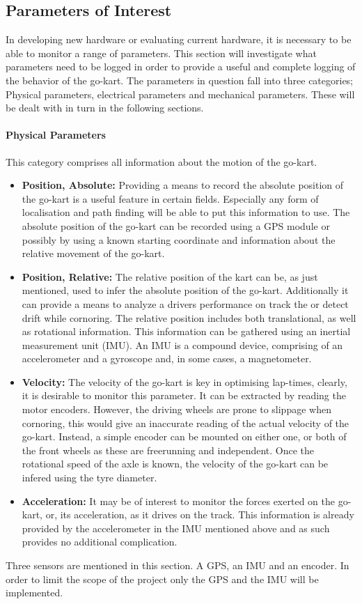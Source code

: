 
\subsection{Parameters of Interest}
\label{sec:parameters}
In developing new hardware or evaluating current hardware, it is necessary to be able to monitor a range of parameters.
This section will investigate what parameters need to be logged in order to provide a useful and complete logging of the behavior of the go-kart.
The parameters in question fall into three categories; Physical parameters, electrical parameters and mechanical parameters.
These will be dealt with in turn in the following sections.
\paragraph*{Physical Parameters}
This category comprises all information about the motion of the go-kart.
\begin{itemize}
	\item \textbf{Position, Absolute:} Providing a means to record the absolute position of the go-kart is a useful feature in certain fields.
	Especially any form of localisation and path finding will be able to put this information to use.
	The absolute position of the go-kart can be recorded using a GPS module or possibly by using a known starting coordinate and information about the relative movement of the go-kart.
	\item \textbf{Position, Relative:} The relative position of the kart can be, as just mentioned, used to infer the absolute position of the go-kart.
	Additionally it can provide a means to analyze a drivers performance on track the or detect drift while cornoring.
	The relative position includes both translational, as well as rotational information.
	This information can be gathered using an inertial measurement unit (IMU).
	An IMU is a compound device, comprising of an accelerometer and a gyroscope and, in some cases, a magnetometer.
	\item \textbf{Velocity:} The velocity of the go-kart is key in optimising lap-times, clearly, it is desirable to monitor this parameter.
	It can be extracted by reading the motor encoders.
	However, the driving wheels are prone to slippage when cornoring, this would give an inaccurate reading of the actual velocity of the go-kart.
	Instead, a simple encoder can be mounted on either one, or both of the front wheels as these are freerunning and independent.
	Once the rotational speed of the axle is known, the velocity of the go-kart can be infered using the tyre diameter.
	\item \textbf{Acceleration:} It may be of interest to monitor the forces exerted on the go-kart, or, its acceleration, as it drives on the track.
	This information is already provided by the accelerometer in the IMU mentioned above and as such provides no additional complication.
\end{itemize}
Three sensors are mentioned in this section.
A GPS, an IMU and an encoder.
In order to limit the scope of the project only the GPS and the IMU will be implemented.
